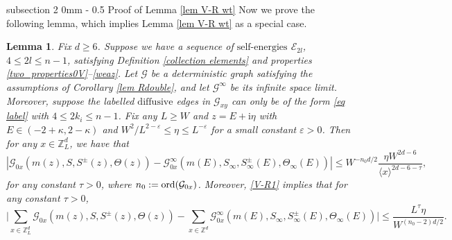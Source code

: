 \documentclass{article}
\makeatletter
\newcommand{\1}{\mathds{1}}
\numberwithin{equation}{section}
\newcommand{\ord}{{\rm{ord}}}
\newcommand{\be}{\begin{equation}}
\newcommand{\ee}{\end{equation}}
\newcommand{\e}{{\varepsilon}}
\renewcommand{\cal}{\mathcal}
\newcommand{\wt}{\widetilde}
\newcommand{\ii}{\mathrm{i}} %
\renewcommand{\leq}{\leqslant}
\renewcommand{\geq}{\geqslant}
\renewcommand{\le}{\leq}
\renewcommand{\ge}{\geq}
\newcommand{\Z}{\mathbb{Z}}
\newcommand{\dashed}{\text{diffusive}}
\newcommand{\selfs}{\text{self-energies}}
\theoremstyle{plain} %
\newtheorem{lemma}[theorem]{Lemma}
\theoremstyle{remark}
\newcommand{\cor}{\color{red}}
\newcommand{\Sdelta}{{\Sigma}_T}
\newcommand{\wtSdelta}{\Sigma}
\newcommand{\wtSinfty}{\wt\Sigma^{\infty}}
\newcommand{\Sele}{{\mathcal E}}
\newcommand{\Selek}{{\mathcal E}}
\renewcommand{\subsection}{\@startsection
{subsection}%
{2}%
{0mm}%
{-\baselineskip}%
{0.5\baselineskip}%
{\normalfont\bf\itshape}} %
\makeatother
\begin{document}

\subsection{Proof of Lemma \ref{lem V-R wt}}\label{subsec_inf_pf}
Now we prove the following lemma, which implies Lemma \ref{lem V-R wt} as a special case. %
\begin{lemma}\label{lemm V-R}
Fix $d\ge 6$. Suppose we have a sequence of $\selfs$ $\Sele_{2l}$, $4\le 2l \le n-1$, satisfying Definition \ref{collection elements} and properties \eqref{two_properties0V}--\eqref{weaz}. 
Let $\cal G$ be a deterministic graph satisfying the assumptions of Corollary \ref{lem Rdouble}, and let $\cal G^\infty $ be its infinite space limit. Moreover, suppose the labelled $\dashed$ edges in $\cal G_{xy}$ can only be of the form \eqref{eq label} with $4\le 2k_i \le n-1$.  Fix any $L\ge W$ and $z=E+\ii \eta$ with $E\in (-2+\kappa,2-\kappa)$ and $W^{2}/L^{2-\e}\le \eta\le L^{-\e}$ for a small constant $\e>0$. Then for any $x\in \Z_L^d$, we have that
\be\label{V-R1}  
\left|\cal G_{0x}(m(z),S, S^{\pm}(z),\Theta(z))-\cal G^\infty_{0x}( m(E), S_\infty,  S_\infty^{\pm}(E), \Theta_\infty(E))\right| \le W^{-n_0d/2} \frac{\eta W^{2d-6}}{\langle x\rangle^{2d-6-\tau}},
\ee
for any constant $\tau>0$, where $ n_0:=\ord(\cal G_{0x})$. Moreover, \eqref{V-R1} implies that for any constant $\tau>0$,
\be\label{V-R2}  \bigg|\sum_{x\in \Z_L^d} \cal G_{0x}(m(z),S, S^{\pm}(z),\Theta(z))-\sum_{x\in \Z^d} \cal G^\infty_{0x}( m(E), S_\infty,  S_\infty^{\pm}(E), \Theta_\infty(E)) \bigg| \le  \frac{L^\tau \eta }{ W^{(n_0-2)d/2}} .\ee
\end{lemma}
\end{document}
